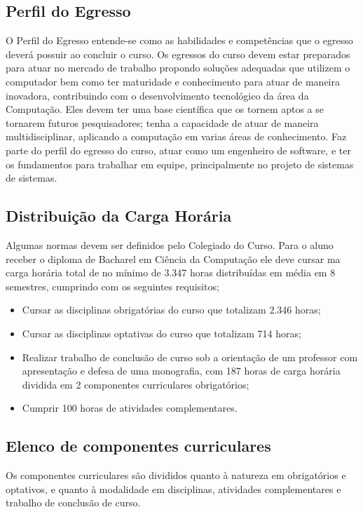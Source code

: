     \subsection{Perfil do Egresso}
    O Perfil do Egresso entende-se como as habilidades e competências que o egresso deverá possuir ao concluir o curso. Os egressos do curso devem estar preparados para atuar no mercado de trabalho propondo soluções adequadas que utilizem o computador bem como ter maturidade e conhecimento para atuar de maneira inovadora, contribuindo com o desenvolvimento tecnológico da área da Computação. Eles devem ter uma base científica que os tornem aptos a se tornarem futuros pesquisadores; tenha a capacidade de atuar de maneira multidisciplinar, aplicando a computação em varias áreas de conhecimento. Faz parte do perfil do egresso do curso, atuar como um engenheiro de software, e ter os fundamentos para trabalhar em equipe, principalmente no projeto de sistemas de sistemas.
    
    
    
    \subsection{Distribuição da Carga Horária}
    Algumas normas devem ser definidos pelo Colegiado do Curso. Para o aluno receber o diploma de Bacharel em Ciência da Computação ele deve cursar ma carga horária total de no mínimo de 3.347 horas distribuídas em média em 8 semestres, cumprindo com os seguintes requisitos; 
    \begin{itemize}
        \item  Cursar as disciplinas obrigatórias do curso que totalizam 2.346 horas; 
        \item  Cursar as disciplinas optativas do curso que totalizam 714 horas; 
        \item  Realizar trabalho de conclusão de curso sob a orientação de um professor com apresentação e defesa de uma monografia, com 187 horas de carga horária dividida em 2 componentes curriculares obrigatórios; 
        \item  Cumprir 100 horas de atividades complementares.
    \end{itemize}



\subsection{Elenco de componentes curriculares}
Os componentes curriculares são divididos quanto à natureza em obrigatórios e optativos, e quanto à modalidade em disciplinas, atividades complementares e trabalho de conclusão de curso.
